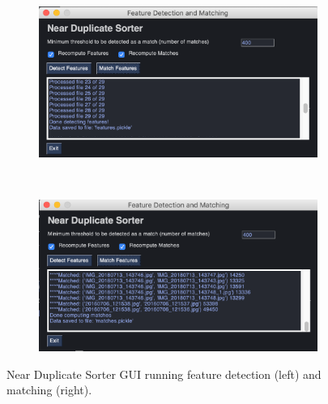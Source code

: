 \documentclass[12pt]{article}
\begin{document}
\begin{figure}[H]
	\centering
	\begin{subfigure}[b]{.5\textwidth}
	\includegraphics[width=1\textwidth]{images/near_duplicate_GUI1.png}
	\end{subfigure}%
	~
	\begin{subfigure}[b]{.5\textwidth}
		\includegraphics[width=1\textwidth]{images/near_duplicate_GUI2.png}
	\end{subfigure}

	\caption{Near Duplicate Sorter GUI running feature detection (left) and matching (right).}
		\label{fig:sort_gui}
\end{figure}
\end{document}
